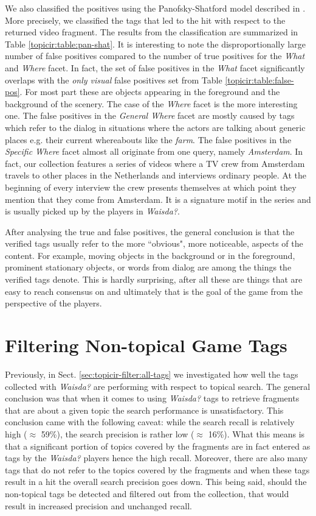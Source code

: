 We also classified the positives using the Panofsky-Shatford model described in \cite{kcap}. More precisely, we classified the tags that led to the hit with respect to the returned video fragment. The results from the classification are summarized in Table \ref{topicir:table:pan-shat}. It is interesting to note the disproportionally large number of false positives compared to the number of true positives for the \textit{What} and \textit{Where} facet. In fact, the set of false positives in the \textit{What} facet significantly overlaps with the \textit{only visual} false positives set from Table \ref{topicir:table:false-pos}. For most part these are objects appearing in the foreground and the background of the scenery. The case of the \textit{Where} facet is the more interesting one. The false positives in the \textit{General Where} facet are mostly caused by tags which refer to the dialog in situations where the actors are talking about generic places e.g. their current whereabouts like the \textit{farm}. The false positives in the \textit{Specific Where} facet almost all originate from one query, namely \textit{Amsterdam}. In fact, our collection features a series of videos where a TV crew from Amsterdam travels to other places in the Netherlands and interviews ordinary people. At the beginning of every interview the crew presents themselves at which point they mention that they come from Amsterdam. It is a signature motif in the series and is usually picked up by the players in \textit{Waisda?}. 

After analysing the true and false positives, the general conclusion is that the verified tags usually refer to the more ``obvious", more noticeable, aspects of the content. For example, moving objects in the background or in the foreground, prominent stationary objects, or words from dialog are among the things the verified tags denote. This is hardly surprising, after all these are things that are easy to reach consensus on and ultimately that is the goal of the game from the perspective of the players. 
\section{Filtering Non-topical Game Tags}\label{sec:topicir-filter:filtering}

Previously, in Sect. \ref{sec:topicir-filter:all-tags} we investigated how well the tags collected with \textit{Waisda?} are performing with respect to topical search. The general conclusion was that when it comes to using \textit{Waisda?} tags to retrieve fragments that are about a given topic the search performance is  unsatisfactory. This conclusion came with the following caveat: while the search recall is relatively high ($\approx$ 59\%), the search precision is rather low ($\approx$ 16\%). What this means is that a significant portion of topics covered by the fragments are in fact entered as tags by the \textit{Waisda?} players hence the high recall. Moreover, there are also many tags that do not refer to the topics covered by the fragments and when these tags result in a hit the overall search precision goes down. This being said, should the non-topical tags be detected and filtered out from the collection, that would result in increased precision and unchanged recall.
